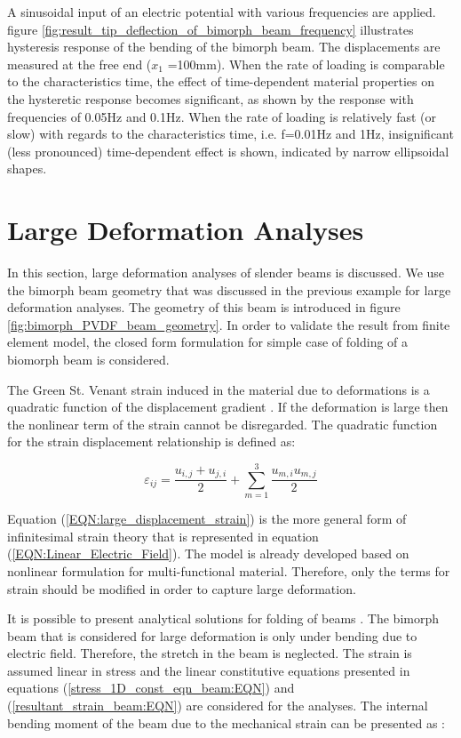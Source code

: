 A sinusoidal input of an electric potential with various frequencies are applied.
figure \ref{fig:result_tip_deflection_of_bimorph_beam_frequency} illustrates hysteresis response of the bending of the bimorph beam.
The displacements are measured at the free end ($x_1$ =100mm).
When the rate of loading is comparable to the characteristics time,
the effect of time-dependent material properties on the hysteretic response becomes significant,
as shown by the response with frequencies of 0.05Hz and 0.1Hz.
When the rate of loading is relatively fast (or slow) with regards to the characteristics time, i.e. f=0.01Hz and 1Hz,
 insignificant (less pronounced) time-dependent effect is shown, indicated by narrow ellipsoidal shapes.
\\


\section{Large Deformation Analyses}
In this section, large deformation analyses of slender beams is discussed.
We use the bimorph beam geometry that was discussed in the previous example for large deformation analyses.
The geometry of this beam is introduced in figure \ref{fig:bimorph_PVDF_beam_geometry}.
In order to validate the result from finite element model, the closed form formulation for simple case of folding of a biomorph beam is considered.

The Green St. Venant strain induced in the material due to deformations is a quadratic function of the displacement gradient \cite{Lai2009}.
If the deformation is large then the nonlinear term of the strain cannot be disregarded.
The quadratic function for the strain displacement relationship is defined as:

\begin{equation}
\varepsilon_{ij}=\frac{u_{i,j}+u_{j,i}}{2}+\sum_{m=1}^{3} \frac{u_{m,i}u_{m,j}}{2}
\label{EQN:large_displacement_strain}
\end{equation}

Equation (\ref{EQN:large_displacement_strain}) is the more general form of infinitesimal strain theory that is represented in equation (\ref{EQN:Linear_Electric_Field}).
The model is already developed based on nonlinear formulation for multi-functional material.
Therefore, only the terms for strain should be modified in order to capture large deformation.

It is possible to present analytical solutions for folding of beams \cite{Muliana2014}.
The bimorph beam that is considered for large deformation is only under bending due to electric field.
Therefore, the stretch in the beam is neglected.
The strain is assumed linear in stress and the linear constitutive equations presented in equations (\ref{stress_1D_const_eqn_beam:EQN}) and (\ref{resultant_strain_beam:EQN}) are considered for the analyses. 
The internal bending moment of the beam due to the mechanical strain can be presented as \cite{Muliana2014}:

